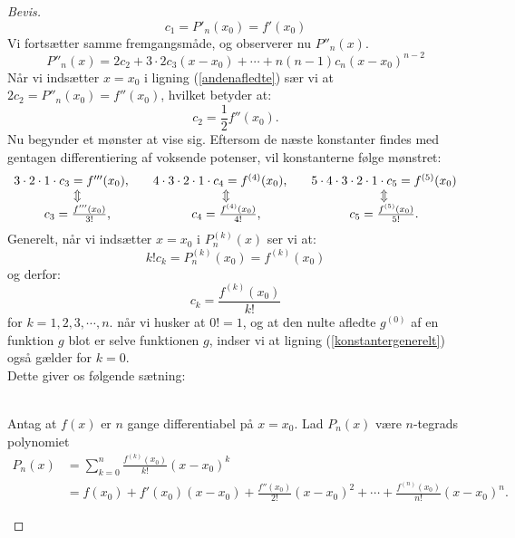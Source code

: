 \documentclass[12pt, a4paper]{article}
\begin{document}
\begin{refsection}
\begin{proof}[Bevis]
\begin{equation*}
    c_1=P'_n(x_0)=f'(x_0)
\end{equation*}
Vi fortsætter samme fremgangsmåde, og observerer nu $P''_n(x)$.
\begin{equation}\label{andenafledte}
    P''_n(x)=2c_2+ 3\cdot2c_3(x-x_0)+\cdots+n(n-1)c_n(x-x_0)^{n-2}
\end{equation}
Når vi indsætter $x=x_0$ i ligning (\ref{andenafledte}) sær vi at $2c_2 = P''_n(x_0)=f''(x_0)$, hvilket betyder at:
\begin{equation*}
    c_2=\frac{1}{2}f''(x_0).
\end{equation*}
Nu begynder et mønster at vise sig. Eftersom de næste konstanter findes med gentagen differentiering af voksende potenser, vil konstanterne følge mønstret: 
\begin{equation*}
    \begin{array}{c c c}
        3\cdot2\cdot1\cdot c_3=f'''(x_0),\quad &4\cdot3\cdot2\cdot1\cdot c_4=f^{(4)}(x_0),\quad&5\cdot4\cdot3\cdot2\cdot1\cdot c_5=f^{(5)}(x_0)\\
        \Updownarrow&\Updownarrow&\Updownarrow\\
        c_3=\frac{f'''(x_0)}{3!},&c_4=\frac{f^{(4)}(x_0)}{4!},&c_5=\frac{f^{(5)}(x_0)}{5!}.
    \end{array}
\end{equation*}
Generelt, når vi indsætter $x=x_0$ i $P_n^{(k)}(x)$ ser vi at:
\begin{equation*}
    k!c_k=P_n^{(k)}(x_0)=f^{(k)}(x_0)
\end{equation*}
og derfor:
\begin{equation}\label{konstantergenerelt}
    \boxed{c_k=\frac{f^{(k)}(x_0)}{k!}}
\end{equation}
for $k=1,2,3,\cdots,n$. når vi husker at $0!=1$, og at den nulte afledte  $g^{(0)}$ af en funktion $g$ blot er selve funktionen $g$, indser vi at ligning (\ref{konstantergenerelt}) også gælder for $k=0$.\\
Dette giver os følgende sætning:\\
\\
   \begin{savenotes}
\begin{mdframed}
Antag at $f(x)$ er $n$ gange differentiabel på $x=x_0$. Lad $P_n(x)$ være $n$-tegrads polynomiet
\begin{equation}\label{taylorpolynomier}
    \begin{aligned}
        P_n(x)&=\sum_{k=0}^n\frac{f^{(k)}(x_0)}{k!}(x-x_0)^k\\
              &=f(x_0)+f'(x_0)(x-x_0)+\frac{f''(x_0)}{2!}(x-x_0)^2+\cdots+\frac{f^{(n)}(x_0)}{n!}(x-x_0)^n.

\end{aligned}
\end{equation}
\end{mdframed}
\end{savenotes}
\end{proof}
\end{refsection}
\end{document}
